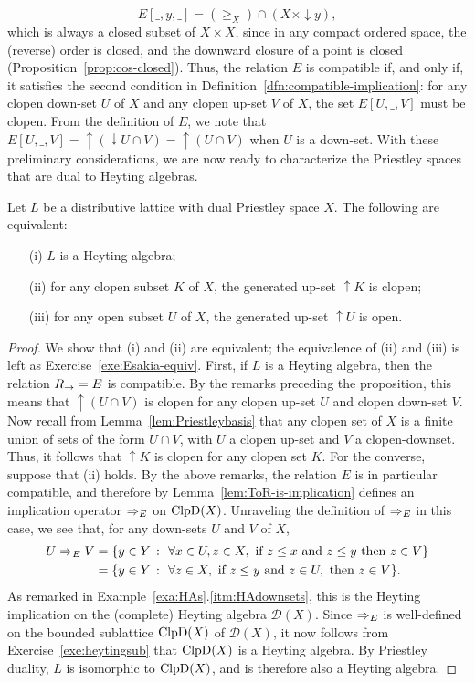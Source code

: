 \[ E[\_,y,\_] = ({\geq_X}) \cap (X \times {\downarrow} y),\]
which is always a closed subset of $X \times X$, since in any compact ordered space, the (reverse) order is closed, and the downward closure of a point is closed (Proposition~\ref{prop:cos-closed}).
Thus, the relation $E$ is compatible if, and only if, it satisfies the second
condition in Definition~\ref{dfn:compatible-implication}: for any clopen
down-set $U$ of $X$ and any clopen up-set $V$ of $X$, the set $E[U,\_,V]$ must
be clopen. From the definition of $E$, we note that $E[U,\_,V] = {\uparrow}
({\downarrow} U \cap V) = {\uparrow} (U \cap V)$ when $U$ is a down-set. With
these preliminary considerations, we are now ready to characterize the Priestley
spaces that are dual to Heyting algebras.
\begin{proposition}\label{prop:esakiaspace}
Let $L$ be a distributive lattice with dual Priestley space $X$. The following are equivalent:
\begin{enumerate}
  \item[(i)] $L$ is a Heyting algebra;
  \item[(ii)] for any clopen subset $K$ of $X$, the generated up-set ${\uparrow} K$ is clopen;
  \item[(iii)] for any open subset $U$ of $X$, the generated up-set ${\uparrow} U$ is open.
\end{enumerate}
\end{proposition}
\begin{proof}
  We show that (i) and (ii) are equivalent; the equivalence of (ii) and (iii) is left as Exercise~\ref{exe:Esakia-equiv}.
  First, if $L$ is a Heyting algebra, then the relation $R_{\to} = E$ is compatible. By the remarks preceding the proposition, this means that ${\uparrow} (U \cap V)$ is clopen for any clopen up-set $U$ and clopen down-set $V$. Now recall from Lemma~\ref{lem:Priestleybasis} that any clopen set of $X$ is a finite union of sets of the form $U \cap V$, with $U$ a clopen up-set and $V$ a clopen-downset. Thus, it follows that ${\uparrow} K$ is clopen for any clopen set $K$.
  For the converse, suppose that (ii) holds. By the above remarks, the relation $E$ is in particular compatible, and therefore by Lemma~\ref{lem:ToR-is-implication} defines an implication operator $\Rightarrow_E$ on $\mathrm{ClpD}(X)$. Unraveling the definition of $\Rightarrow_E$ in this case, we see that, for any down-sets $U$ and $V$ of $X$, 
  \begin{align*}
    U \Rightarrow_E V &= \{ y \in Y \ \colon \ \forall x \in U, z \in X, \text{ if } z \leq x \text{ and } z \leq y \text{ then } z \in V \} \\
    &= \{ y \in Y \ \colon \ \forall z \in X, \text{ if } z \leq y \text{ and } z \in U, \text { then } z \in V\}.
  \end{align*}
  As remarked in Example~\ref{exa:HAs}.\ref{itm:HAdownsets}, this is the Heyting implication on the (complete) Heyting algebra $\mathcal{D}(X)$. Since $\Rightarrow_E$ is well-defined on the bounded sublattice $\mathrm{ClpD}(X)$ of $\mathcal{D}(X)$, it now follows from Exercise~\ref{exe:heytingsub} that $\mathrm{ClpD}(X)$ is a Heyting algebra. By Priestley duality, $L$ is isomorphic to $\mathrm{ClpD}(X)$, and is therefore also a Heyting algebra.
\end{proof}
